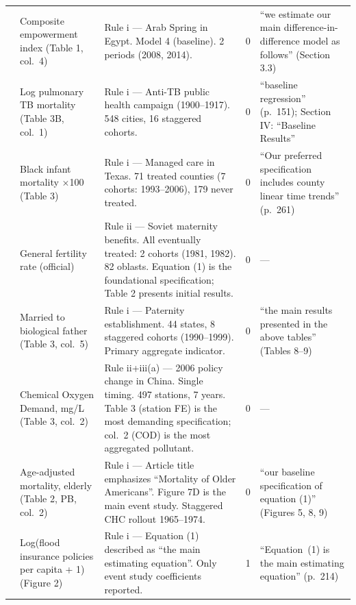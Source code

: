 \begin{small}
\begin{longtable}{p{2.2cm} p{3.0cm} p{5.5cm} p{0.8cm} p{4cm}}
\textcite{bargain2019women}
& Composite empowerment index (Table 1, col.~4)
& Rule i --- Arab Spring in Egypt. Model 4 (baseline). 2 periods (2008, 2014).
& 0
& ``we estimate our main difference-in-difference model as follows'' (Section 3.3) \\

\textcite{anderson2019tuberculosis}
& Log pulmonary TB mortality (Table 3B, col.~1)
& Rule i --- Anti-TB public health campaign (1900--1917). 548 cities, 16 staggered cohorts.
& 0
& ``baseline regression'' (p.~151); Section IV: ``Baseline Results'' \\

\textcite{kuziemko2018managed}
& Black infant mortality $\times$100 (Table 3)
& Rule i --- Managed care in Texas. 71 treated counties (7 cohorts: 1993--2006), 179 never treated.
& 0
& ``Our preferred specification includes county linear time trends'' (p.~261) \\

\textcite{malkova2018maternity}
& General fertility rate (official)
& Rule ii --- Soviet maternity benefits. All eventually treated: 2 cohorts (1981, 1982). 82 oblasts. Equation (1) is the foundational specification; Table 2 presents initial results.
& 0
& --- \\

\textcite{rossinslater2017signing}
& Married to biological father (Table 3, col.~5)
& Rule i --- Paternity establishment. 44 states, 8 staggered cohorts (1990--1999). Primary aggregate indicator.
& 0
& ``the main results presented in the above tables'' (Tables 8--9) \\

\textcite{kahn2015water}
& Chemical Oxygen Demand, mg/L (Table 3, col.~2)
& Rule ii+iii(a) --- 2006 policy change in China. Single timing. 497 stations, 7 years. Table 3 (station FE) is the most demanding specification; col.~2 (COD) is the most aggregated pollutant.
& 0
& --- \\

\textcite{bailey2015war}
& Age-adjusted mortality, elderly (Table 2, PB, col.~2)
& Rule i --- Article title emphasizes ``Mortality of Older Americans''. Figure 7D is the main event study. Staggered CHC rollout 1965--1974.
& 0
& ``our baseline specification of equation (1)'' (Figures 5, 8, 9) \\

\textcite{gallagher2014learning}
& Log(flood insurance policies per capita + 1) (Figure 2)
& Rule i --- Equation (1) described as ``the main estimating equation''. Only event study coefficients reported.
& 1
& ``Equation~(1) is the main estimating equation'' (p.~214) \\


\end{longtable}
\end{small}
